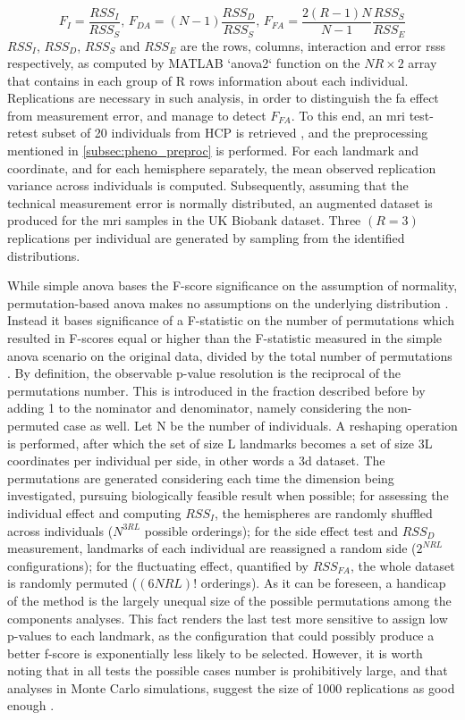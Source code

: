 $$
F_I=\frac{RSS_I}{RSS_S}\text{, }
F_{DA}=(N-1)\frac{RSS_D}{RSS_S}\text{, }
F_{FA}=\frac{2(R-1)N}{N-1} \frac{RSS_S}{RSS_E} 
$$ 
$RSS_I$, $RSS_D$, $RSS_S$ and $RSS_E$ are the rows, columns, interaction and error \acp{rss} respectively, as computed by MATLAB `anova2` function on the $NR\times2$ array that contains in each group of R rows information about each individual. Replications are necessary in such analysis, in order to distinguish the \ac{fa} effect from measurement error, and manage to detect $F_{FA}$. To this end, an \ac{mri} test-retest subset of 20 individuals from HCP is retrieved \cite{VanEssen2013}, and the preprocessing mentioned in \autoref{subsec:pheno_preproc} is performed. For each landmark and coordinate, and for each hemisphere separately, the mean observed replication variance across individuals is computed. Subsequently, assuming that the technical measurement error is normally distributed, an augmented dataset is produced for the \ac{mri} samples in the UK Biobank dataset. Three $(R=3)$ replications per individual are generated by sampling from the identified distributions.

While simple \ac{anova} bases the F-score significance on the assumption of normality, permutation-based \ac{anova} makes no assumptions on the underlying distribution \cite{Anderson2001}. Instead it bases significance of a F-statistic on the number of permutations which resulted in F-scores equal or higher than the F-statistic measured in the simple \ac{anova} scenario on the original data, divided by the total number of permutations \cite{Klingenberg1998}. By definition, the observable p-value resolution is the reciprocal of the permutations number. This is introduced in the fraction described before by adding 1 to the nominator and denominator, namely considering the non-permuted case as well. Let N be the number of individuals. A reshaping operation is performed, after which the set of size L landmarks becomes a set of size 3L coordinates per individual per side, in other words a \ac{3d} dataset. The permutations are generated considering each time the dimension being investigated, pursuing biologically feasible result when possible; for assessing the individual effect and computing $RSS_I$, the hemispheres are randomly shuffled across individuals  ($N^{3RL}$ possible orderings); for the side effect test and $RSS_{D}$ measurement, landmarks of each individual are reassigned a random side ($2^{NRL}$ configurations); for the fluctuating effect, quantified by $RSS_{FA}$, the whole dataset is randomly permuted ($(6NRL)!$ orderings). As it can be foreseen, a handicap of the method is the largely unequal size of the possible permutations among the components analyses. This fact renders the last test more sensitive to assign low p-values to each landmark, as the configuration that could possibly produce a better f-score is exponentially less likely to be selected. However, it is worth noting that in all tests the possible cases number is prohibitively large, and that analyses in Monte Carlo simulations, suggest the size of 1000 replications as good enough \cite{Marozzi2004}. 

